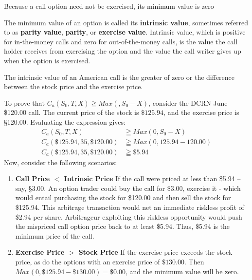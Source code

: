 \documentclass{book}
\theoremstyle{definition}
\theoremstyle{remark}
\begin{document}
        \begin{tcolorbox}[colback=blue!5!white,colframe=blue!75!black, title=Sticky Note]
            Because a call option need not be exercised, its minimum value is zero 
        \end{tcolorbox}              
            
            The minimum value of an option is called its \textbf{intrinsic value}, sometimes referred to as \textbf{parity value}, \textbf{parity}, or \textbf{exercise value}. Intrinsic value, which is positive for in-the-money calls and zero for out-of-the-money calls, is the value the call holder receives from exercising the option and the value the call writer gives up when the option is exercised. 
            
        \begin{tcolorbox}[colback=blue!5!white,colframe=blue!75!black, title=Sticky Note]
            The intrinsic value of an American call is the greater of zero or the difference between the stock price and the exercise price. 
        \end{tcolorbox}              
            
            To prove that $C_a(S_0, T, X) \geqq Max(, S_0 - X)$, consider the DCRN June \$120.00 call. The current price of the stock is $\$125.94$, and the exercise price is \S120.00. Evaluating the expression gives:
                \begin{align*}
                    C_a(S_0, T, X) & \geqq Max(0, S_0 - X) \\ 
                    C_a(\$125.94, 35, \$120.00) & \geqq Max(0, 125.94-120.00) \\
                    C_a(\$125.94, 35, \$120.00) & \geqq \$5.94
                \end{align*}
            Now, consider the following scenarios: 
                \begin{enumerate}
                    \item \textbf{Call Price $<$ Intrinsic Price}
                        If the call were priced at less than \$5.94 --say, \S3.00. An option trader could buy the call for \$3.00, exercise it - which would entail purchasing the stock for \$120.00 and then sell the stock for \$125.94. This arbitrage transaction would net an immediate riskless profit of \$2.94 per share. Arbitrageur exploiting this riskless opportunity would push the mispriced call option price back to at least \$5.94. Thus, \$5.94 is the minimum price of the call.
                                
                    \item \textbf{Exercise Price $>$ Stock Price}
                        If the exercise price exceeds the stock price, as do the options with an exercise price of $\$130.00$. Then $Max(0, \$125.94 - \$130.00) = \$0.00$, and the minimum value will be zero. 
                \end{enumerate}
        
\end{document}
